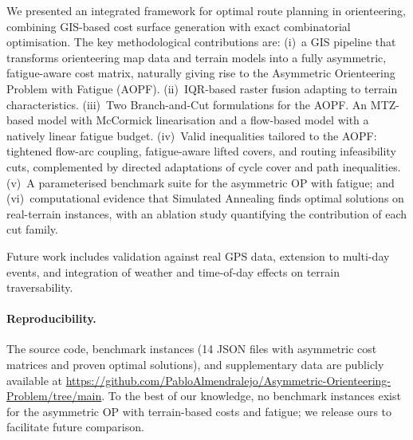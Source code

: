 \documentclass[11pt,a4paper]{article}
\begin{document}
We presented an integrated framework for optimal route planning in orienteering, combining GIS-based cost surface generation with exact combinatorial optimisation.
The key methodological contributions are:
(i)~a GIS pipeline that transforms orienteering map data and terrain models into a fully asymmetric, fatigue-aware cost matrix, naturally giving rise to the Asymmetric Orienteering Problem with Fatigue (AOPF).
(ii)~IQR-based raster fusion adapting to terrain characteristics.
(iii)~Two Branch-and-Cut formulations for the AOPF. An MTZ-based model with McCormick linearisation and a flow-based model with a natively linear fatigue budget.
(iv)~Valid inequalities tailored to the AOPF: tightened flow-arc coupling, fatigue-aware lifted covers, and routing infeasibility cuts, complemented by directed adaptations of cycle cover and path inequalities.
(v)~A parameterised benchmark suite for the asymmetric OP with fatigue; and
(vi)~computational evidence that Simulated Annealing finds optimal solutions on real-terrain instances, with an ablation study quantifying the contribution of each cut family.

Future work includes validation against real GPS data, extension to multi-day events, and integration of weather and time-of-day effects on terrain traversability.

\paragraph{Reproducibility.}
The source code, benchmark instances (14 JSON files with asymmetric cost matrices and proven optimal solutions), and supplementary data are publicly available at \url{https://github.com/PabloAlmendralejo/Asymmetric-Orienteering-Problem/tree/main}.
To the best of our knowledge, no benchmark instances exist for the asymmetric OP with terrain-based costs and fatigue; we release ours to facilitate future comparison.



\end{document}
